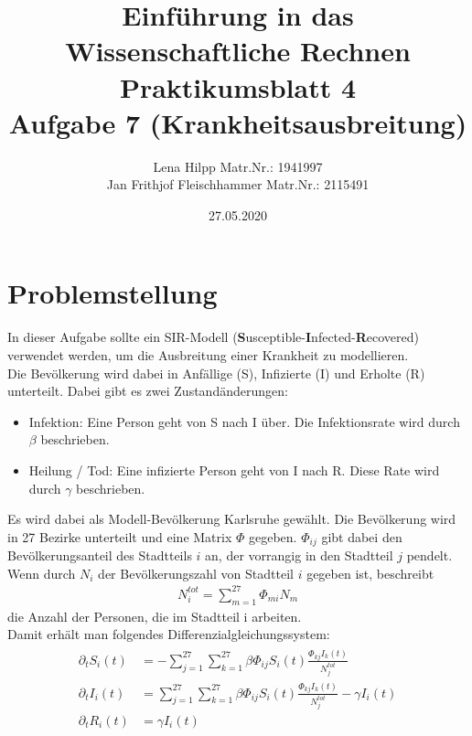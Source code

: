 \documentclass[11pt,a4paper]{article}
\title{Einf\"uhrung in das Wissenschaftliche Rechnen\\
  Praktikumsblatt 4\\
  Aufgabe 7 (Krankheitsausbreitung)}
\author{Lena Hilpp Matr.Nr.: 1941997\\Jan Frithjof Fleischhammer Matr.Nr.: 2115491}
\date{27.05.2020}
\begin{document}
  
  \maketitle
  
  \section*{Problemstellung}
  
  In dieser Aufgabe sollte ein SIR-Modell (\textbf{S}usceptible-\textbf{I}nfected-\textbf{R}ecovered) verwendet werden, um die Ausbreitung einer Krankheit zu modellieren.\\
   
  Die Bev\"olkerung wird dabei in Anf\"allige (S), Infizierte (I) und Erholte (R) unterteilt. Dabei gibt es zwei Zustand\"anderungen:
  \begin{itemize}
  \item Infektion: Eine Person geht von S nach I \"uber. Die Infektionsrate wird durch $\beta$ beschrieben.
  \item Heilung / Tod: Eine infizierte Person geht von I nach R. Diese Rate wird durch $\gamma$ beschrieben.
  \end{itemize}
  
  Es wird dabei als Modell-Bev\"olkerung Karlsruhe gew\"ahlt. Die Bev\"olkerung wird in 27 Bezirke unterteilt und eine Matrix $\Phi$ gegeben. $\Phi_{ij}$ gibt dabei den Bev\"olkerungsanteil des Stadtteils $i$ an, der vorrangig in den Stadtteil $j$ pendelt.\\
  
  Wenn durch $N_i$ der Bev\"olkerungszahl von Stadtteil $i$ gegeben ist, beschreibt
  \begin{align*}
  N_i^{tot}=\sum_{m=1}^{27}\Phi_{mi}N_m
  \end{align*}
  die Anzahl der Personen, die im Stadtteil i arbeiten.\\
  Damit erh\"alt man folgendes Differenzialgleichungssystem:
  \begin{align*}
  \begin{split}
  \partial_tS_i(t)&=-\sum_{j=1}^{27}\sum_{k=1}^{27}\beta\Phi_{ij}S_i(t)\frac{\Phi_{kj}I_k(t)}{N_j^{tot}}\\
  \partial_tI_i(t)&=\sum_{j=1}^{27}\sum_{k=1}^{27}\beta\Phi_{ij}S_i(t)\frac{\Phi_{kj}I_k(t)}{N_j^{tot}}-\gamma I_i(t)\\
  \partial_tR_i(t)&=\gamma I_i(t)
  \end{split}
  \end{align*}
  
\end{document}
